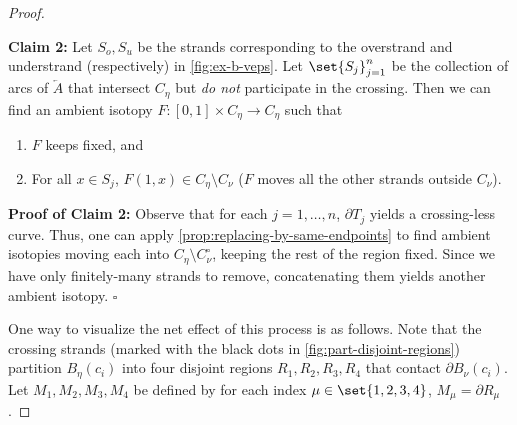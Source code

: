 \begin{proof}
  \begin{leftbar}
    \textbf{Claim 2:} Let $S_o, S_u$ be the strands corresponding to
    the overstrand and understrand (respectively) in
    \cref{fig:ex-b-veps}. Let $\set{S_j}_{j =1}^{n}$ be the collection
    of arcs of $\overleftarrow{A}$ that intersect $C_\eta$ but
    \emph{do not} participate in the crossing. Then we can find an
    ambient isotopy $F : [0,1] \times C_\eta \to C_\eta$ such that
    \begin{enumerate}
      \item $F$ keeps  fixed, and
      \item For all $x \in S_j$, $F(1, x) \in C_\eta \setminus
        C_\nu$ ($F$ moves all the other strands outside $C_\nu$).
    \end{enumerate}

    \textbf{Proof of Claim 2:} Observe that for each $j=1,\ldots, n$,
    $\partial T_j$ yields a crossing-less curve. Thus, one can apply
    \cref{prop:replacing-by-same-endpoints} to find ambient isotopies
    moving each into $C_\eta \setminus C_\nu^\circ$, keeping the rest
    of the region fixed. Since we have only finitely-many strands to
    remove, concatenating them yields another ambient isotopy. \hfill
    $\square$


  \end{leftbar}

  One way to visualize the net effect of this process is as follows.
  Note that the crossing strands (marked with the black dots in
  \cref{fig:part-disjoint-regions}) partition $B_{\eta}(c_i)$ into
  four disjoint regions $R_1, R_2, R_3, R_4$ that contact $\partial
  B_{\nu}(c_i)$. Let $M_1, M_2, M_3, M_4$ be defined by for each index
  $\mu \in \set{1,2,3,4}$, $M_\mu = \partial R_\mu$.


\end{proof}

